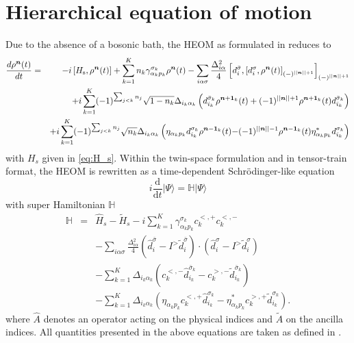 \documentclass{article}
\newcommand{\dif}{\mathrm{d}}
\begin{document}
\section{Hierarchical equation of motion}
Due to the absence of a bosonic bath, the HEOM as formulated in \cite{ke2022hierarchical} reduces to
\begin{eqnarray}
	\label{heom}
	\frac{d \rho^{\bm{n}}(t) }{dt} 
	&=&- i\left[H_{\rm{s}},\rho^{\bm{n}}(t)\right] 
	+{\sum_{k=1}^K n_{k}\gamma^{\sigma_k}_{\alpha_k p_k}  \rho^{\bm{n} }  }(t)
	-\sum_{i\alpha \sigma} \frac{\Delta^2_{i\alpha}}{4} 
	\left[d_{i}^{\bar{\sigma}}, \left[d_{i}^{\sigma}, \rho^{\bm{n}}(t)\right]_{(-)^{||\bm{n}||+1}}\right]_{(-)^{||\bm{n}||+1}}
	\\
	&&+i\sum_{k=1}^{K} (-1)^{\sum_{j<k}n_{j}}  \sqrt{1-n_k} \Delta_{i_k \alpha_k}\left(  d_{i_k}^{\bar{\sigma}_k} \rho^{\bm{n}+{\bm{1}}_k}(t)+
	(-1)^{||\bm{n}||+1}\rho^{\bm{n}+\bm{1}_k} (t)d^{\bar{\sigma}_k}_{i_k} \right)\nonumber \\
	&& +i\sum_{k=1}^{K} (-1)^{\sum_{j<k}n_{j}}  \sqrt{n_k} \Delta_{i_k \alpha_k}\left(\eta_{\alpha_k p_k} d^{\sigma_k}_{i_k} \rho^{\bm{n}-\bm{1}_k}(t)  
	{ -(-1)^{||\bm{n}||-1}}
	\rho^{\bm{n}-\bm{1}_k}(t)  \eta_{\alpha_kp_k}^{*} d^{\sigma_k}_{i_k}\right)  \nonumber 
\end{eqnarray}
with $H_s$ given in \cref{eq:H_s}. Within the twin-space formulation and in tensor-train format, the HEOM is rewritten as a time-dependent Schrödinger-like equation  
\begin{equation}
	i\frac{\dif }{\dif t}\vert\Psi\rangle = \mathbb{H}\vert \Psi\rangle
\end{equation}
with super Hamiltonian $\mathbb{H}$
\begin{eqnarray}
	\label{Hamiltonian}
	\mathbb{H} &=&\hat{H}_s -\tilde{H}_s 
	-i\sum_{k=1}^{K} \gamma^{\sigma_k}_{\alpha_k p_k} c^{<,+}_{k}   c^{<,-}_{k}  \\
	&&
	-\sum_{i \alpha \sigma} \frac{\Delta^2_{i\alpha}}{4} 
	(\hat{d}_{i}^{\bar{\sigma}} - I^{>} \tilde{d}_{i}^{\bar{\sigma}})\cdot (\hat{d}_{i}^{\sigma}-I^{>}\tilde{d}_{i}^{\sigma})  \nonumber \\
	&& 
	-\sum_{k=1}^{K}  \Delta_{i_k \alpha_k} \left( c^{<,-}_{k} \hat{d}^{\bar{\sigma}_k}_{i_k} -  c^{>,-}_{k} \tilde{d}_{i_k}^{\bar{\sigma}_k}\right)  \nonumber \\
	&&
	-\sum_{k=1}^{K}\Delta_{i_k \alpha_k} \left( \eta_{\alpha_k p_k}  c^{<,+}_{k}  \hat{d}^{\sigma_k}_{i_k}  -\eta_{\alpha_kp_k}^{*}  c^{>,+}_{k}  \tilde{d}^{\sigma_k}_{i_k}\right).  \nonumber 
\end{eqnarray}
where $\hat{A}$ denotes an operator acting on the physical indices and $\tilde{A}$ on the ancilla indices. All quantities presented in the above equations are taken as defined in \cite{ke2022hierarchical}.
\end{document}
